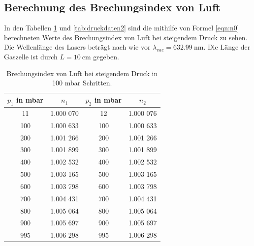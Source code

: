 \subsection{Berechnung des Brechungsindex von Luft}
In den Tabellen \ref{tab:druckdaten1} und \ref{tab:druckdaten2} sind die mithilfe von Formel \eqref{eqn:n0} berechneten Werte des Brechungsindex von Luft bei steigendem Druck zu sehen.
Die Wellenlänge des Lasers beträgt nach wie vor $\lambda_{vac}=\SI{632.99}{\nano\meter}$\cite{Anleitung}. Die Länge der Gaszelle ist durch $L=\SI{10}{\centi\meter}$\cite{Anleitung} gegeben.
\begin{table}[H]
  \center
  \caption{Brechungsindex von Luft bei steigendem Druck in 100 mbar Schritten.}
  \label{tab:druckdaten1}
 \begin{tabular}{c|c|c|c}
   $p_1$ in mbar&$n_1$ &$p_2$ in mbar &$n_2$\\
   \hline
   11  &1.000 070 & 12  & 1.000 076\\
   100 &1.000 633 & 100 & 1.000 633\\
   200 &1.001 266 & 200 & 1.001 266\\
   300 &1.001 899 & 300 & 1.001 899\\
   400 &1.002 532 & 400 & 1.002 532\\
   500 &1.003 165 & 500 & 1.003 165\\
   600 &1.003 798 & 600 & 1.003 798\\
   700 &1.004 431 & 700 & 1.004 431\\
   800 &1.005 064 & 800 & 1.005 064\\
   900 &1.005 697 & 900 & 1.005 697\\
   995 &1.006 298 & 995 & 1.006 298\\
 \end{tabular}
\end{table}

